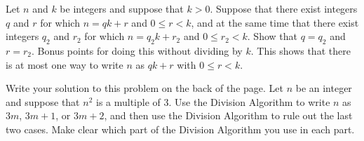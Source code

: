 \yourname


\blist{6.5in}
\item Let $n$ and $k$ be integers and suppose that $k > 0$.
Suppose that there exist integers $q$ and $r$ for which $n = qk + r$ and $0 \leq r < k$, and at the same time that there exist integers $q_2$ and $r_2$ for which $n = q_2 k + r_2$ and $0 \leq r_2 < k$.
Show that $q = q_2$ and $r = r_2$.
Bonus points for doing this without dividing by $k$.
This shows that there is at most one way to write $n$ as $qk + r$ with $0 \leq r < k$.

\item Write your solution to this problem on the back of the page.
Let $n$ be an integer and suppose that $n^2$ is a multiple of 3.
Use the Division Algorithm to write $n$ as $3m$, $3m+1$, or $3m+2$, and then use the Division Algorithm to rule out the last two cases.
Make clear which part of the Division Algorithm you use in each part.

\elist
\vfill          %
